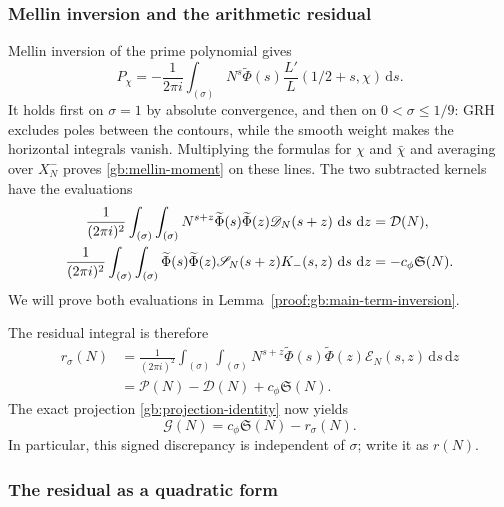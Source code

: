\documentclass[12pt,a4paper]{amsart}
\numberwithin{equation}{section}
\def\d{\,{\rm d}}
\def\le{\leqslant}
\theoremstyle{plain}
\theoremstyle{definition}
\theoremstyle{remark}
\begin{document}
\subsubsection{Mellin inversion and the arithmetic residual}
\label{story:mellin}

Mellin inversion of the prime polynomial gives
\begin{equation}\label{gb:mellin-P}
 P_\chi=-\frac1{2\pi i}\int_{(\sigma)}
    N^s\widetilde{\Phi}(s)\frac{L'}L(1/2+s,\chi)\,\mathrm ds.
\end{equation}
It holds first on $\sigma=1$ by absolute convergence, and then
on $0<\sigma\le1/9$: GRH excludes poles between the contours,
while the smooth weight makes the horizontal integrals vanish.
Multiplying the formulas for $\chi$ and $\bar\chi$ and averaging
over $X_N^-$ proves \eqref{gb:mellin-moment} on these lines.
The two subtracted kernels have the evaluations
\begin{align}
 \frac1{(2\pi i)^2}\int_{(\sigma)}\int_{(\sigma)}
  N^{s+z}\widetilde{\Phi}(s)\widetilde{\Phi}(z){\mathscr D}_N(s+z)\,\d s\,\d z
 &=\mathcal D(N),\label{gb:diagonal-inversion}\\
 \frac1{(2\pi i)^2}\int_{(\sigma)}\int_{(\sigma)}
  \widetilde{\Phi}(s)\widetilde{\Phi}(z)
  \mathscr S_N(s+z)K_-(s,z)\,\d s\,\d z
 &=-c_\phi\mathfrak S(N).\label{gb:beta-inversion}
\end{align}
We will prove both evaluations in
Lemma~\ref{proof:gb:main-term-inversion}.

The residual integral is therefore
\begin{equation}\label{v3w:residual}
 \begin{aligned}
 r_\sigma(N)&=\frac1{(2\pi i)^2}
 \int_{(\sigma)}\int_{(\sigma)}
 N^{s+z}\widetilde\Phi(s)\widetilde\Phi(z)\mathscr E_N(s,z)
 \,\mathrm ds\,\mathrm dz\\
 &=\mathcal P(N)-\mathcal D(N)+c_\phi\mathfrak S(N).
 \end{aligned}
\end{equation}
The exact projection \eqref{gb:projection-identity} now yields
\begin{equation}\label{v3w:exact}
 \mathcal G(N)=c_\phi\mathfrak S(N)-r_\sigma(N).
\end{equation}
In particular, this signed discrepancy is independent of $\sigma$;
write it as $r(N)$.

\subsubsection{The residual as a quadratic form}
\label{story:hardy-quadratic}
\end{document}
